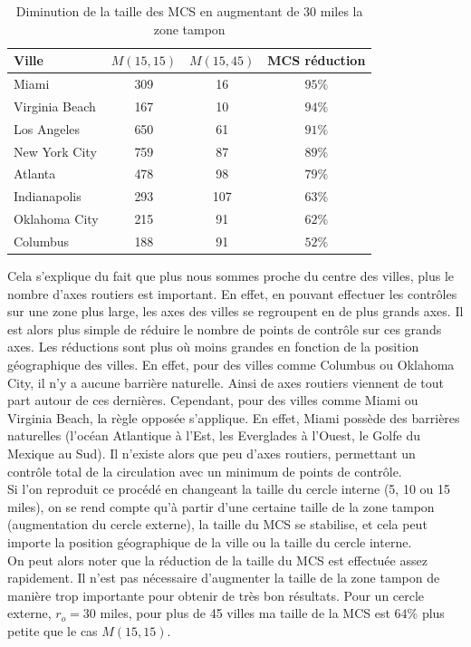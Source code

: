 \begin{table}[H]
 \centering
 \begin{tabular}{|l|c|c|c|}
    \toprule
    \textbf{Ville} & \textbf{$M(15,15)$} & \textbf{$M(15,45)$} & \textbf{MCS réduction}\\\midrule
    Miami & 309 & 16 & $95\%$ \\\hline
    Virginia Beach & 167 & 10 & $94\%$ \\\hline
    Los Angeles & 650 & 61 & $91\%$ \\\hline
    New York City & 759 & 87 & $89\%$ \\\hline
    Atlanta & 478 & 98 & $79\%$ \\\hline
    Indianapolis & 293 & 107 & $63\%$ \\\hline
    Oklahoma City & 215 & 91 & $62\%$ \\\hline
    Columbus & 188 & 91 & $52\%$ \\\bottomrule
 \end{tabular}
 \caption{Diminution de la taille des MCS en augmentant de 30 miles la zone tampon}
 \label{tab:1}
\end{table}
Cela s'explique du fait que plus nous sommes proche du centre des villes, plus le nombre d'axes routiers est important. En effet, en pouvant effectuer les contrôles sur une zone plus large, les axes des villes se regroupent en de plus grands axes. Il est alors plus simple de réduire le nombre de points de contrôle sur ces grands axes. Les réductions sont plus où moins grandes en fonction de la position géographique des villes. En effet, pour des villes comme Columbus ou Oklahoma City, il n'y a aucune barrière naturelle. Ainsi de axes routiers viennent de tout part autour de ces dernières. Cependant, pour des villes comme Miami ou Virginia Beach, la règle opposée s'applique. En effet, Miami possède des barrières naturelles (l'océan Atlantique à l'Est, les Everglades à l'Ouest, le Golfe du Mexique au Sud). Il n'existe alors que peu d'axes routiers, permettant un contrôle total de la circulation avec un minimum de points de contrôle.\\
Si l'on reproduit ce procédé en changeant la taille du cercle interne (5, 10 ou 15 miles), on se rend compte qu'à partir d'une certaine taille de la zone tampon (augmentation du cercle externe), la taille du MCS se stabilise, et cela peut importe la position géographique de la ville ou la taille du cercle interne.\\
On peut alors noter que la réduction de la taille du MCS est effectuée assez rapidement. Il n'est pas nécessaire d'augmenter la taille de la zone tampon de manière trop importante pour obtenir de très bon résultats. Pour un cercle externe, $r_o=30$ miles, pour plus de 45 villes ma taille de la MCS est $64\%$ plus petite que le cas $M(15,15)$.\\~\\\par

